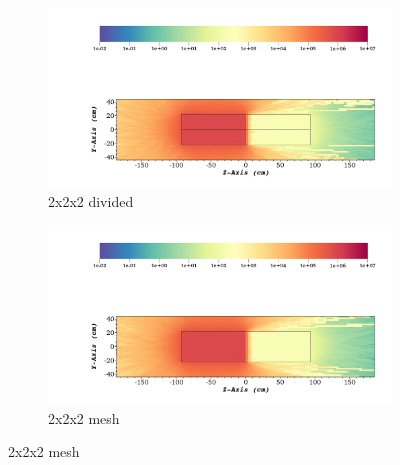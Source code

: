 \begin{figure}[H]
	\begin{subfigure}[t]{0.5\textwidth}
		\includegraphics[width=\linewidth, trim={5cm 1cm 2cm 16cm},clip]{../figs/toy_p1/dose_VPI_2x_split.png}
		\caption{2x2x2 divided}
		\label{fig:1dose_2x_split}
	\end{subfigure}\hfill
	\begin{subfigure}[t]{0.5\textwidth}
		\includegraphics[width=\linewidth, trim={5cm 1cm 2cm 16cm},clip]{../figs/toy_p1/dose_VPI_2x_mesh.png}
		\caption{2x2x2 mesh}
		\label{fig:1dose_2x_mesh}
	\end{subfigure}


\end{figure}
